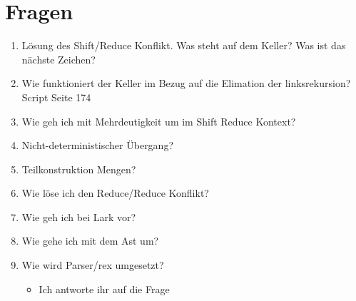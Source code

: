 \section{Fragen}
\begin{enumerate}
  \item Lösung des Shift/Reduce Konflikt. Was steht auf dem Keller? Was ist das nächste Zeichen?
  \item Wie funktioniert der Keller im Bezug auf die Elimation der linksrekursion? Script Seite 174
  \item Wie geh ich mit Mehrdeutigkeit um im Shift Reduce Kontext?
  
  \item Nicht-deterministischer Übergang?
  \item Teilkonstruktion Mengen?
  \item Wie löse ich den Reduce/Reduce Konflikt?
  \item Wie geh ich bei Lark vor?
  \item Wie gehe ich mit dem Ast um?
  \item Wie wird Parser/rex umgesetzt?
  \begin{itemize}
    \item []  Ich antworte ihr auf die Frage  
  \end{itemize}
\end{enumerate}